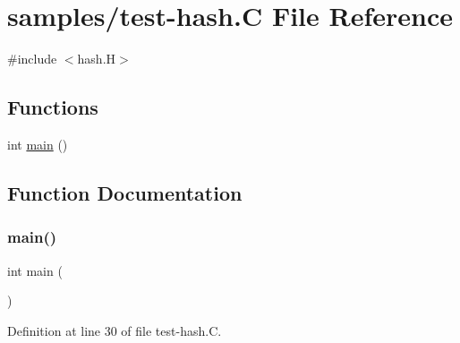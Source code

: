\hypertarget{test-hash_8_c}{}\section{samples/test-\/hash.C File Reference}
\label{test-hash_8_c}
{\ttfamily \#include $<$hash.\+H$>$}\newline
\subsection*{Functions}
\begin{DoxyCompactItemize}
\item 
int \hyperlink{test-hash_8_c_ae66f6b31b5ad750f1fe042a706a4e3d4}{main} ()
\end{DoxyCompactItemize}


\subsection{Function Documentation}
\mbox{\label{test-hash_8_c_ae66f6b31b5ad750f1fe042a706a4e3d4}} 
\subsubsection{\texorpdfstring{main()}{main()}}
{\footnotesize\ttfamily int main (\begin{DoxyParamCaption}{ }\end{DoxyParamCaption})}



Definition at line 30 of file test-\/hash.\+C.

